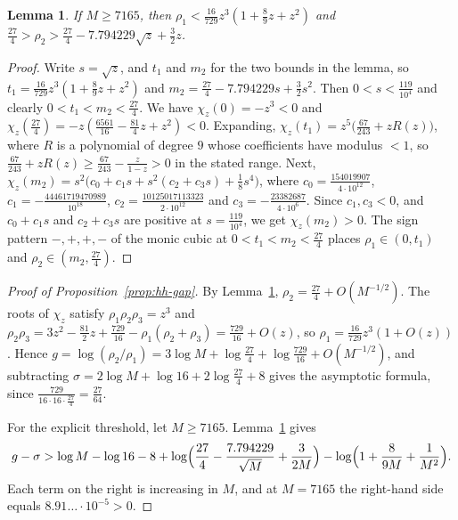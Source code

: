 \documentclass[oneside,english,11pt]{amsart}
\newtheorem{lemma}[thm]{Lemma}
\begin{document}
\begin{lemma}\label{lem:hh-roots}
If $M\ge7165$, then $\rho_1<\frac{16}{729}z^3(1+\frac89z+z^2)$ and $\frac{27}4>\rho_2>\frac{27}4-7.794229\sqrt z+\frac32z$.
\end{lemma}

\begin{proof}
Write $s=\sqrt z$, and $t_1$ and $m_2$ for the two bounds in the lemma, so $t_1=\frac{16}{729}z^3(1+\frac89z+z^2)$ and $m_2=\frac{27}4-7.794229s+\frac32s^2$. Then $0<s<\frac{119}{10^4}$ and clearly $0<t_1<m_2<\frac{27}4$. We have $\chi_z(0)=-z^3<0$ and $\chi_z(\frac{27}4)=-z(\frac{6561}{16}-\frac{81}4z+z^2)<0$.
Expanding, $\chi_z(t_1)=z^5\bigl(\frac{67}{243}+zR(z)\bigr)$, where $R$ is a polynomial of degree $9$ whose coefficients have
modulus $<1$, so $\frac{67}{243}+zR(z)\ge\frac{67}{243}-\frac{z}{1-z}>0$ in the stated range.
Next, $\chi_z(m_2)=s^2\bigl(c_0+c_1s+s^2(c_2+c_3s)+\frac18s^4\bigr)$, where
$c_0=\frac{154019907}{4\cdot10^{12}}$, $c_1=-\frac{44461719470989}{10^{18}}$, $c_2=\frac{10125017113323}{2\cdot10^{12}}$ and
$c_3=-\frac{23382687}{4\cdot10^6}$. Since $c_1,c_3<0$, and $c_0+c_1s$ and $c_2+c_3s$ are positive at $s=\frac{119}{10^4}$, we get $\chi_z(m_2)>0$. The sign pattern
$-,+,+,-$ of the monic cubic at $0<t_1<m_2<\frac{27}4$ places $\rho_1\in(0,t_1)$ and $\rho_2\in(m_2,\frac{27}4)$.
\end{proof}

\begin{proof}[Proof of Proposition~\ref{prop:hh-gap}]
By Lemma~\ref{lem:hh-roots}, $\rho_2=\frac{27}4+O(M^{-1/2})$. The roots of $\chi_z$ satisfy $\rho_1\rho_2\rho_3=z^3$ and
$\rho_2\rho_3=3z^2-\frac{81}2z+\frac{729}{16}-\rho_1(\rho_2+\rho_3)=\frac{729}{16}+O(z)$, so $\rho_1=\frac{16}{729}z^3(1+O(z))$.
Hence $g=\log(\rho_2/\rho_1)=3\log M+\log\frac{27}4+\log\frac{729}{16}+O(M^{-1/2})$, and subtracting
$\sigma=2\log M+\log16+2\log\frac{27}4+8$ gives the asymptotic formula, since $\frac{729}{16\cdot16\cdot\frac{27}4}=\frac{27}{64}$.

For the explicit threshold, let $M\ge7165$. Lemma~\ref{lem:hh-roots} gives
\[
 g-\sigma>\log M-\log16-8+\log\Bigl(\frac{27}4-\frac{7.794229}{\sqrt M}+\frac3{2M}\Bigr)-\log\Bigl(1+\frac8{9M}+\frac1{M^2}\Bigr).
\]
Each term on the right is increasing in $M$, and at $M=7165$ the right-hand side equals $8.91\ldots\cdot10^{-5}>0$.
\end{proof}
\end{document}
